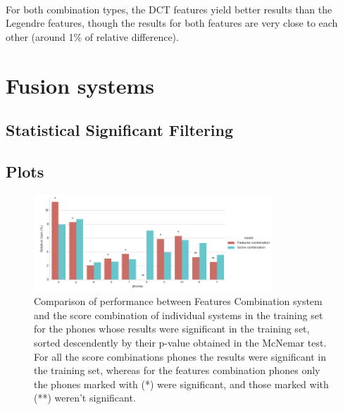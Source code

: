 ~

For both combination types, the DCT features yield better results than the Legendre features,
though the results for both features are very close to each other (around 1\% of relative
difference).

\section{Fusion systems}

\subsection{Statistical Significant Filtering}

\subsection{Plots}

\begin{figure}[H]
	\centering
	\includegraphics[width=0.8\textwidth]{files/figures/results/relatives/relatives-fusion-systems-dev-mcnemar.png}
	\caption{Comparison of performance between Features Combination system and the score combination
	of individual systems in the training set for the phones whose results were significant
	in the training set, sorted descendently by their p-value obtained in the McNemar test.
	For all the score combinations phones the results were significant in the training set,
	whereas for the features combination phones only the phones marked with (*) were significant,
	and those marked with (**) weren't significant.}
	\label{fig:fusionMcnemarDev}
\end{figure}

